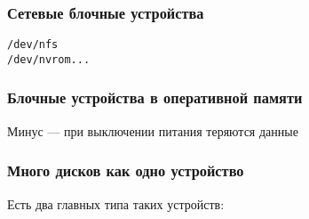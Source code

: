 \subsubsection{Сетевые блочные устройства}

\begin{verbatim}
/dev/nfs
/dev/nvrom...
\end{verbatim}

\subsubsection{Блочные устройства в оперативной памяти}

Минус --- при выключении питания теряются данные

\subsubsection{Много дисков как одно устройство}

Есть два главных типа таких устройств:

